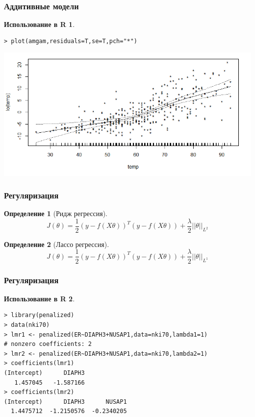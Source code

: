 \documentclass{beamer}
\newtheorem{defn}{Определение}
\newtheorem{exmpr}{Использование в R}
\begin{document}
\begin{frame}[containsverbatim]
\frametitle{Аддитивные модели}
\begin{exmpr}
\begin{verbatim}
> plot(amgam,residuals=T,se=T,pch="*")
\end{verbatim}
\end{exmpr}
\includegraphics[width=1\textwidth,height=0.6\textheight]{gamplot1.png}
\end{frame}

\begin{frame}
\frametitle{Регуляризация}
\begin{defn}[Ридж регрессия]
$$J(\theta)=\frac{1}{2}(y-f(X\theta))^T(y-f(X\theta))+\frac{\lambda}{2}||\theta||_{L^2}$$
\end{defn}
\begin{defn}[Лассо регрессия]
$$J(\theta)=\frac{1}{2}(y-f(X\theta))^T(y-f(X\theta))+\frac{\lambda}{2}||\theta||_{L^1}$$
\end{defn}
\end{frame}

\begin{frame}[containsverbatim]
\frametitle{Регуляризация}
\begin{exmpr}
\begin{verbatim}
> library(penalized)
> data(nki70)
> lmr1 <- penalized(ER~DIAPH3+NUSAP1,data=nki70,lambda1=1)
# nonzero coefficients: 2
> lmr2 <- penalized(ER~DIAPH3+NUSAP1,data=nki70,lambda2=1)
> coefficients(lmr1)
(Intercept)      DIAPH3 
   1.457045   -1.587166
> coefficients(lmr2)
(Intercept)      DIAPH3      NUSAP1 
  1.4475712  -1.2150576  -0.2340205
\end{verbatim}
\end{exmpr}
\end{frame}
\end{document}
